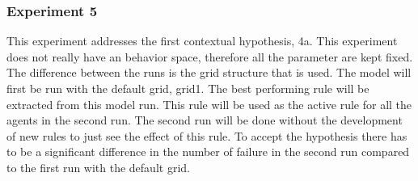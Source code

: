 \documentclass[a4paper]{article}
\begin{document}
\subsubsection{Experiment 5}
This experiment addresses the first contextual hypothesis, 4a. This experiment does not really have 
an behavior space, therefore all the parameter are kept fixed. 
The difference between the runs is the grid structure that is used. The model will first be run with the default grid, grid1.
The best performing rule will be extracted from this model run. This rule will be used as the active rule for all the 
agents in the second run. The second run will be done without the development of new rules  to just see the effect 
of this rule. 
To accept the hypothesis there has to be a significant difference in the number of failure in the second run compared 
to the first run with the default grid. 
\end{document}
